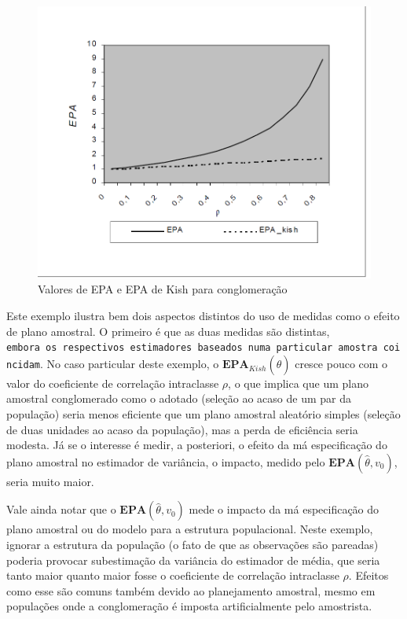 \documentclass[]{book}
\numberwithin{example}{chapter}
\numberwithin{remark}{chapter}
\numberwithin{definition}{chapter}
\begin{document}
\begin{figure}[htbp]
\centering
\includegraphics{Figuras/fig41.png}
\caption{\label{fig:epacong}Valores de EPA e EPA de Kish para conglomeração}
\end{figure}

Este exemplo ilustra bem dois aspectos distintos do uso de medidas como
o efeito de plano amostral. O primeiro é que as duas medidas são
distintas,
\texttt{embora\ os\ respectivos\ estimadores\ baseados\ numa\ particular\ amostra\ coincidam}.
No caso particular deste exemplo, o
\(\mathbf{EPA}_{Kish}\left( \hat{\theta}\right)\) cresce pouco com o
valor do coeficiente de correlação intraclasse \(\rho\), o que implica
que um plano amostral conglomerado como o adotado (seleção ao acaso de
um par da população) seria menos eficiente que um plano amostral
aleatório simples (seleção de duas unidades ao acaso da população), mas
a perda de eficiência seria modesta. Já se o interesse é medir, a
posteriori, o efeito da má especificação do plano amostral no estimador
de variância, o impacto, medido pelo
\(\mathbf{EPA}\left( \hat{\theta},v_{0}\right)\), seria muito maior.

Vale ainda notar que o \(\mathbf{EPA}\left( \hat{\theta},v_{0}\right)\)
mede o impacto da má especificação do plano amostral ou do modelo para a
estrutura populacional. Neste exemplo, ignorar a estrutura da população
(o fato de que as observações são pareadas) poderia provocar
subestimação da variância do estimador de média, que seria tanto maior
quanto maior fosse o coeficiente de correlação intraclasse \(\rho\).
Efeitos como esse são comuns também devido ao planejamento amostral,
mesmo em populações onde a conglomeração é imposta artificialmente pelo
amostrista.
\end{document}

